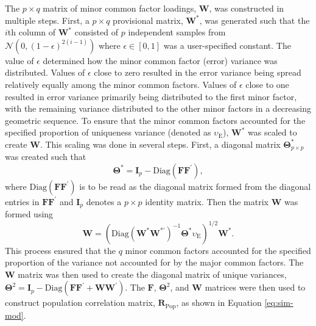 \documentclass[
  english,
  man]{apa6}
\begin{document}
The \(p \times q\) matrix of minor common factor loadings, \(\mathbf{W}\), was constructed in multiple steps. First, a \(p \times q\) provisional matrix, \(\mathbf{W}^*\), was generated such that the \(i\)th column of \(\mathbf{W}^*\) consisted of \(p\) independent samples from \(\mathcal{N}(0, (1 - \epsilon)^{2(i-1)})\) where \(\epsilon \in [0,1]\) was a user-specified constant. The value of \(\epsilon\) determined how the minor common factor (error) variance was distributed. Values of \(\epsilon\) close to zero resulted in the error variance being spread relatively equally among the minor common factors. Values of \(\epsilon\) close to one resulted in error variance primarily being distributed to the first minor factor, with the remaining variance distributed to the other minor factors in a decreasing geometric sequence. To ensure that the minor common factors accounted for the specified proportion of uniqueness variance (denoted as \(\upsilon_{\textrm{E}}\)), \(\mathbf{W}^*\) was scaled to create \(\mathbf{W}\). This scaling was done in several steps. First, a diagonal matrix \(\mathbf{\Theta}^*_{p \times p}\) was created such that
\begin{equation}
\mathbf{\Theta}^* = \mathbf{I}_p - \textrm{Diag}(\mathbf{F}\mathbf{F}^\prime),
\label{eq:theta-star}
\end{equation}
where \(\textrm{Diag}(\mathbf{F}\mathbf{F}^\prime)\) is to be read as the diagonal matrix formed from the diagonal entries in \(\mathbf{F}\mathbf{F}^\prime\) and \(\mathbf{I}_p\) denotes a \(p \times p\) identity matrix. Then the matrix \(\mathbf{W}\) was formed using
\begin{equation}
\mathbf{W} = (\textrm{Diag}(\mathbf{W}^* \mathbf{W}^{*\prime})^{-1} \mathbf{\Theta}^* \upsilon_\textrm{E})^{1/2} \mathbf{W}^*.
\label{eq:W-matrix}
\end{equation}
This process ensured that the \(q\) minor common factors accounted for the specified proportion of the variance not accounted for by the major common factors. The \(\mathbf{W}\) matrix was then used to create the diagonal matrix of unique variances, \(\mathbf{\Theta}^2 = \mathbf{I}_p - \textrm{Diag}(\mathbf{FF}^\prime + \mathbf{WW}^\prime)\). The \(\mathbf{F}\), \(\mathbf{\Theta}^2\), and \(\mathbf{W}\) matrices were then used to construct population correlation matrix, \(\mathbf{R}_{\textrm{Pop}}\), as shown in Equation \eqref{eq:sim-mod}.
\end{document}
